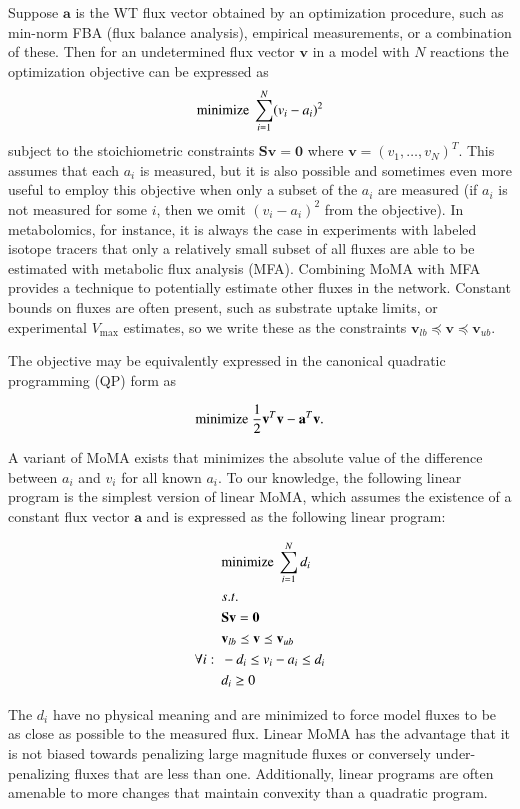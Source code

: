 Suppose $\mathbf{a}$ is the WT flux vector obtained by an optimization
procedure, such as min-norm FBA (flux balance analysis), empirical
measurements, or a combination of these. Then for an undetermined flux
vector $\mathbf{v}$ in a model with $N$ reactions the optimization
objective can be expressed as
\[ \textnormal{minimize}\ \sum\limits_{i=1}^N (v_i-a_i)^2 \] subject to the
stoichiometric constraints $\mathbf{S v} = \mathbf{0}$ where
$\mathbf{v} = (v_1, \ldots, v_N)^T$. This assumes that each $a_i$ is
measured, but it is also possible and sometimes even more useful to
employ this objective when only a subset of the $a_i$ are measured (if
$a_i$ is not measured for some $i$, then we omit $(v_i-a_i)^2$ from
the objective). In metabolomics, for instance, it is always the case
in experiments with labeled isotope tracers that only a relatively
small subset of all fluxes are able to be estimated with metabolic
flux analysis (MFA). Combining MoMA with MFA provides a technique to
potentially estimate other fluxes in the network.  Constant bounds on
fluxes are often present, such as substrate uptake limits, or
experimental $V_{\max}$ estimates, so we write these as the constraints
$\mathbf{v}_{lb} \preceq \mathbf{v} \preceq \mathbf{v}_{ub}$.

The objective may be equivalently expressed in the canonical quadratic
programming (QP) form as

\[ \textnormal{minimize}\ \frac{1}{2}\mathbf{v}^T \mathbf{v} -
\mathbf{a}^T \mathbf{v}\textnormal{.}\]

A variant of MoMA exists that minimizes the absolute value of the
difference between $a_i$ and $v_i$ for all known $a_i$. To our
knowledge, the following linear program is the simplest version of
linear MoMA, which assumes the existence of a constant flux vector
$\mathbf{a}$ and is expressed as the following linear program:

\begin{align*}
&\textnormal{minimize}\ \sum\limits_{i=1}^N d_i  \\
&s.t.\\
&\mathbf{S v} = \mathbf{0} \\
&\mathbf{v}_{lb} \preceq \mathbf{v} \preceq \mathbf{v}_{ub} \\
\forall i:~~&-d_i \le v_i-a_i \le d_i \\
&d_i \ge 0
\end{align*}

The $d_i$ have no physical meaning and are minimized to force model
fluxes to be as close as possible to the measured flux.  Linear MoMA
has the advantage that it is not biased towards penalizing large
magnitude fluxes or conversely under-penalizing fluxes that are less
than one. Additionally, linear programs are often amenable to more
changes that maintain convexity than a quadratic program.

